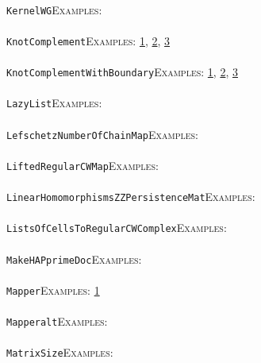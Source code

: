 \documentclass[a4paper,11pt]{report}
\begin{document}
{{ \\
 \texttt{KernelWG}{\nobreakspace}{\nobreakspace}{\nobreakspace}{\nobreakspace}\textsc{Examples:} \\
 \\
 \texttt{KnotComplement}{\nobreakspace}{\nobreakspace}{\nobreakspace}{\nobreakspace}\textsc{Examples:} \href{tutorial/chap1.html} {1}{\nobreakspace}, \href{tutorial/chap3.html} {2}{\nobreakspace}, \href{../www/SideLinks/About/aboutCoverinSpaces.html} {3}{\nobreakspace} \\
 \\
 \texttt{KnotComplementWithBoundary}{\nobreakspace}{\nobreakspace}{\nobreakspace}{\nobreakspace}\textsc{Examples:} \href{tutorial/chap1.html} {1}{\nobreakspace}, \href{tutorial/chap3.html} {2}{\nobreakspace}, \href{../www/SideLinks/About/aboutCoverinSpaces.html} {3}{\nobreakspace} \\
 \\
 \texttt{LazyList}{\nobreakspace}{\nobreakspace}{\nobreakspace}{\nobreakspace}\textsc{Examples:} \\
 \\
 \texttt{LefschetzNumberOfChainMap}{\nobreakspace}{\nobreakspace}{\nobreakspace}{\nobreakspace}\textsc{Examples:} \\
 \\
 \texttt{LiftedRegularCWMap}{\nobreakspace}{\nobreakspace}{\nobreakspace}{\nobreakspace}\textsc{Examples:} \\
 \\
 \texttt{LinearHomomorphismsZZPersistenceMat}{\nobreakspace}{\nobreakspace}{\nobreakspace}{\nobreakspace}\textsc{Examples:} \\
 \\
 \texttt{ListsOfCellsToRegularCWComplex}{\nobreakspace}{\nobreakspace}{\nobreakspace}{\nobreakspace}\textsc{Examples:} \\
 \\
 \texttt{MakeHAPprimeDoc}{\nobreakspace}{\nobreakspace}{\nobreakspace}{\nobreakspace}\textsc{Examples:} \\
 \\
 \texttt{Mapper}{\nobreakspace}{\nobreakspace}{\nobreakspace}{\nobreakspace}\textsc{Examples:} \href{tutorial/chap4.html} {1}{\nobreakspace} \\
 \\
 \texttt{Mapper{\textunderscore}alt}{\nobreakspace}{\nobreakspace}{\nobreakspace}{\nobreakspace}\textsc{Examples:} \\
 \\
 \texttt{MatrixSize}{\nobreakspace}{\nobreakspace}{\nobreakspace}{\nobreakspace}\textsc{Examples:} \\
}}
\end{document}
